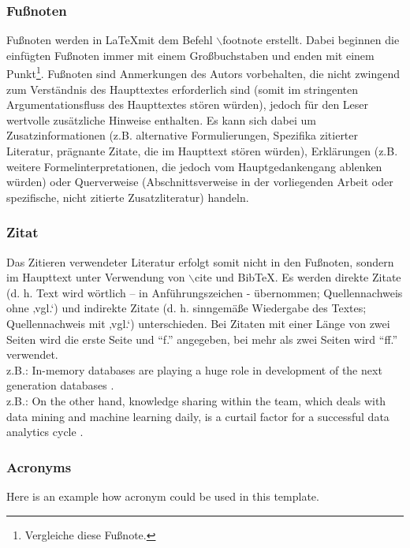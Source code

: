 \documentclass[11pt]{scrartcl}
\begin{document}
\subsubsection{Fußnoten}

Fußnoten werden in \LaTeX mit dem Befehl $\backslash$footnote erstellt. Dabei beginnen die einfügten Fußnoten immer mit einem Großbuchstaben und enden mit einem Punkt\footnote{Vergleiche diese Fußnote.}. Fußnoten sind Anmerkungen des Autors vorbehalten, die nicht zwingend zum Verständnis des Haupttextes erforderlich sind (somit im stringenten Argumentationsfluss des Haupttextes stören würden), jedoch für den Leser wertvolle zusätzliche Hinweise enthalten. Es kann sich dabei um Zusatzinformationen (z.B. alternative Formulierungen, Spezifika zitierter Literatur, prägnante Zitate, die im Haupttext stören würden), Erklärungen (z.B. weitere Formelinterpretationen, die jedoch vom Hauptgedankengang ablenken würden) oder Querverweise (Abschnittsverweise in der vorliegenden Arbeit oder spezifische, nicht zitierte Zusatzliteratur) handeln.

\subsubsection{Zitat}

Das Zitieren verwendeter Literatur erfolgt somit nicht in den Fußnoten, sondern im Haupttext unter Verwendung von $\backslash$cite und BibTeX. Es werden direkte Zitate (d. h. Text wird wörtlich – in Anführungszeichen - übernommen; Quellennachweis ohne ‚vgl.‘) und indirekte Zitate (d. h. sinngemäße Wiedergabe des Textes; Quellennachweis mit ‚vgl.‘) unterschieden. Bei Zitaten mit einer Länge von zwei Seiten wird die erste Seite und "`f."' angegeben, bei mehr als zwei Seiten wird "`ff."' verwendet. \\

z.B.: In-memory databases are playing a huge role in development of the next generation databases \citep{Dmitriyev:2014:BigDataUDF}. \\

z.B.: On the other hand, knowledge sharing within the team, which deals with data mining and machine learning daily, is a curtail factor for a successful data analytics cycle \citep{Kruse:18:DataDrivenDecision}.

%
%
\subsubsection{Acronyms}
Here is an example how acronym could be used in this template.
\end{document}
